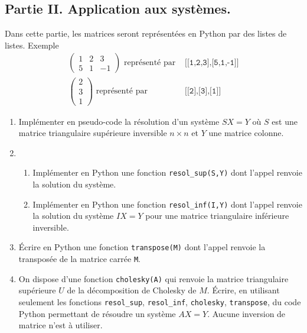 \subsection*{Partie II. Application aux systèmes.}
Dans cette partie, les matrices seront représentées en Python par des listes de listes.
 Exemple
 \begin{align*}
\begin{pmatrix}
 1 & 2 & 3 \\ 5 & 1 &-1
\end{pmatrix}
\text{ représenté par }& \texttt{[[1,2,3],[5,1,-1]]} \\
\begin{pmatrix}
 2 \\ 3 \\ 1
\end{pmatrix}
\text{ représenté par }& \texttt{[[2],[3],[1]]}
 \end{align*}
\begin{enumerate}
 \item Implémenter en pseudo-code la résolution d'un système $SX=Y$ où $S$ est une matrice triangulaire supérieure inversible $n\times n$ et $Y$ une matrice colonne.
 \item 
    \begin{enumerate}
       \item Implémenter en Python une fonction \texttt{resol\_sup(S,Y)} dont l'appel renvoie la solution du système. 
       \item Implémenter en Python une fonction \texttt{resol\_inf(I,Y)} dont l'appel renvoie la solution du système $IX=Y$ pour une matrice triangulaire inférieure inversible. 
    \end{enumerate}
  \item \'Ecrire en Python une fonction \texttt{transpose(M)} dont l'appel renvoie la transposée de la matrice carrée \texttt{M}.
  \item On dispose d'une fonction \texttt{cholesky(A)} qui renvoie la matrice triangulaire supérieure $U$ de la décomposition de Cholesky de $M$. \'Ecrire, en utilisant seulement les fonctions \texttt{resol\_sup}, \texttt{resol\_inf}, \texttt{cholesky}, \texttt{transpose}, du code Python permettant de résoudre un système $AX = Y$. Aucune inversion de matrice n'est à utiliser.    
 \end{enumerate}
 
